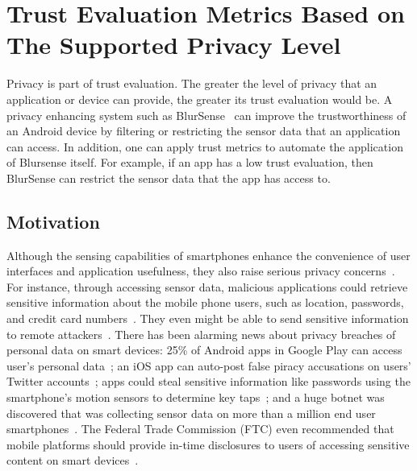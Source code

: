 \section{Trust Evaluation Metrics Based on The Supported Privacy Level}
\label{sec:blursense}
Privacy is part of trust evaluation.
The greater the level of privacy that an application or device can provide, the greater its trust evaluation would be.
A privacy enhancing system such as BlurSense~\cite{cappos2014blursense} can improve the trustworthiness of an Android device  
 by filtering or restricting the sensor data that an application can access.
In addition,
one can apply trust metrics to automate the application of Blursense itself.  For example, if an app has a low trust evaluation,
then BlurSense can restrict the sensor data that the app has access to.

\subsection{Motivation}
Although the sensing capabilities of smartphones enhance the convenience of user interfaces and
application usefulness, they also raise serious privacy
concerns~\cite{shabtai2010google}. For instance, through accessing sensor data,
malicious applications could retrieve sensitive information about the mobile
phone users, such as location, passwords, and credit card numbers~\cite{xu2012taplogger, 
miluzzo2012tapprints, xu2009stealthy, cai2011touchlogger}. They
even might be able to send sensitive information to remote
attackers~\cite{schlegel2011soundcomber, marquardt2011sp}. There
has been alarming news about privacy breaches of personal data on smart devices:
25\% of Android apps in Google Play can access user's personal
data~\cite{toomuch}; an iOS app can auto-post false piracy accusations on users'
Twitter accounts~\cite{tweetios}; apps could steal sensitive information like
passwords using the smartphone's motion sensors to determine key 
taps~\cite{xu2012taplogger}; and a huge botnet was discovered that was collecting sensor data
on more than a million end user smartphones~\cite{botnet}. The
Federal Trade Commission (FTC) even recommended that mobile platforms should
provide in-time disclosures to users of accessing sensitive content on smart
devices~\cite{ftc}. 

